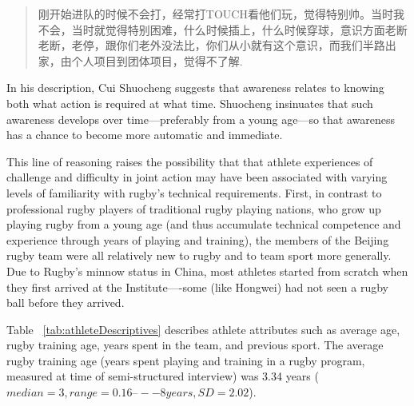 \begin{CJK}{UTF8}{gbsn}
      \begin{quote}
      刚开始进队的时候不会打，经常打TOUCH看他们玩，觉得特别帅。当时我不会，当时就觉得特别困难，什么时候插上，什么时候穿球，意识方面老断老断，老停，跟你们老外没法比，你们从小就有这个意识，而我们半路出家，由个人项目到团体项目，觉得不了解.
      \end{quote}
 In his description, Cui Shuocheng suggests that awareness relates to knowing both what action is required at what time.  Shuocheng insinuates that such awareness develops over time---preferably from a young age---so that awareness has a chance to become more automatic and immediate.

This line of reasoning raises the possibility that that athlete experiences of challenge and difficulty in joint action may have been associated with varying levels of familiarity with rugby's technical requirements.  First, in contrast to professional rugby players of traditional rugby playing nations, who grow up playing rugby from a young age (and thus accumulate technical competence and experience through years of playing and training), the members of the Beijing rugby team were all relatively new to rugby and to team sport more generally.   Due to Rugby's minnow status in China, most athletes started from scratch when they first arrived at the Institute—-some (like Hongwei) had not seen a rugby ball before they arrived.

Table ~\ref{tab:athleteDescriptives} describes athlete attributes such as average age, rugby training age, years spent in the team, and previous sport.  The average rugby training age (years spent playing and training in a rugby program, measured at time of semi-structured interview) was 3.34 years ($median = 3, range = 0.16 –-- 8 years, SD = 2.02$).


\end{CJK}
